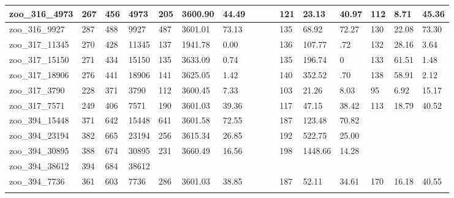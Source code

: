 \begin{landscape}
\begin{longtable}{llllllllllllllll}
zoo\_316\_4973 & 267 & 456 & 4973 & 205 & 3600.90 & 44.49 &  &  &  & 121 & 23.13 & 40.97 & 112 & 8.71 & 45.36 \\ \hline 
zoo\_316\_9927 & 287 & 488 & 9927 & 487 & 3601.01 & 73.13 &  &  &  & 135 & 68.92 & 72.27 & 130 & 22.08 & 73.30 \\ \hline 
zoo\_317\_11345 & 270 & 428 & 11345 & 137 & 1941.78 & 0.00 &  &  &  & 136 & 107.77 & .72 & 132 & 28.16 & 3.64 \\ \hline 
zoo\_317\_15150 & 271 & 434 & 15150 & 135 & 3633.09 & 0.74 &  &  &  & 135 & 196.74 & 0 & 133 & 61.51 & 1.48 \\ \hline 
zoo\_317\_18906 & 276 & 441 & 18906 & 141 & 3625.05 & 1.42 &  &  &  & 140 & 352.52 & .70 & 138 & 58.91 & 2.12 \\ \hline 
zoo\_317\_3790 & 228 & 371 & 3790 & 112 & 3600.45 & 7.33 &  &  &  & 103 & 21.26 & 8.03 & 95 & 6.92 & 15.17 \\ \hline 
zoo\_317\_7571 & 249 & 406 & 7571 & 190 & 3601.03 & 39.36 &  &  &  & 117 & 47.15 & 38.42 & 113 & 18.79 & 40.52 \\ \hline 
zoo\_394\_15448 & 371 & 642 & 15448 & 641 & 3601.58 & 72.55 &  &  &  & 187 & 123.48 & 70.82 &  &  &  \\ \hline 
zoo\_394\_23194 & 382 & 665 & 23194 & 256 & 3615.34 & 26.85 &  &  &  & 192 & 522.75 & 25.00 &  &  &  \\ \hline 
zoo\_394\_30895 & 388 & 674 & 30895 & 231 & 3660.49 & 16.56 &  &  &  & 198 & 1448.66 & 14.28 &  &  &  \\ \hline 
zoo\_394\_38612 & 394 & 684 & 38612 &  &  &  &  &  &  &  &  &  &  &  &  \\ \hline 
zoo\_394\_7736 & 361 & 603 & 7736 & 286 & 3601.03 & 38.85 &  &  &  & 187 & 52.11 & 34.61 & 170 & 16.18 & 40.55 \\ \hline 
\label{tbl:results}
\end{longtable}
\end{landscape}
